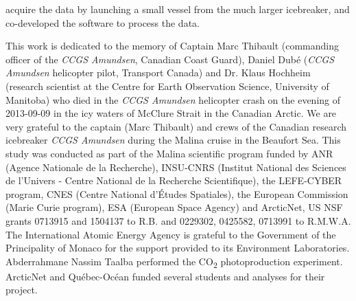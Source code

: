 \documentclass[essd, manuscript]{copernicus}
\begin{document}
{acquire the data by launching a small vessel from the much larger icebreaker, and co-developed the software to process the data.

} %


\begin{acknowledgements}
    This work is dedicated to the memory of Captain Marc Thibault (commanding officer of the \textit{CCGS Amundsen}, Canadian Coast Guard), Daniel Dubé (\textit{CCGS Amundsen} helicopter pilot, Transport Canada) and Dr. Klaus Hochheim (research scientist at the Centre for Earth Observation Science, University of Manitoba) who died in the \textit{CCGS Amundsen} helicopter crash on the evening of 2013-09-09 in the icy waters of McClure Strait in the Canadian Arctic. We are very grateful to the captain (Marc Thibault) and crews of the Canadian research icebreaker \textit{CCGS Amundsen} during the Malina cruise in the Beaufort Sea. This study was conducted as part of the Malina scientific program funded by ANR (Agence Nationale de la Recherche), INSU-CNRS (Institut National des Sciences de l’Univers - Centre National de la Recherche Scientifique), the LEFE-CYBER program, CNES (Centre National d'Études Spatiales), the European Commission (Marie Curie program), ESA (European Space Agency) and ArcticNet, US NSF grants 0713915 and 1504137 to R.B. and 0229302, 0425582, 0713991 to R.M.W.A. The International Atomic Energy Agency is grateful to the Government of the Principality of Monaco for the support provided to its Environment Laboratories. Abderrahmane Nassim Taalba performed the CO\textsubscript{2} photoproduction experiment. ArcticNet and Québec-Océan funded several students and analyses for their project.
\end{acknowledgements}






\end{document}
